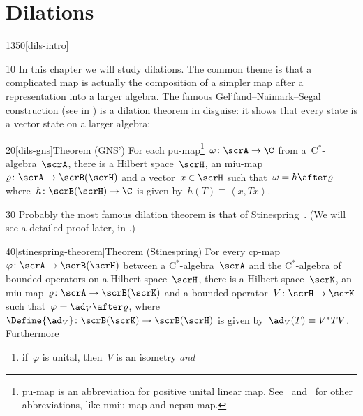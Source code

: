 
\chapter{Dilations}\label{chapter1}

\begin{parsec}{1350}[dils-intro]%
\begin{point}{10}%
In this chapter we will study dilations.
The common theme is that a complicated map
    is actually the composition of a simpler map
    after a representation into a larger algebra.
    The famous Gel'fand--Naimark--Segal construction (see 
        in \cite{bram})
    is a dilation theorem in disguise:
    it shows that every state is a vector state on a larger algebra:
\end{point}
\begin{point}{20}[dils-gns]{Theorem (GNS')}%
    For each pu-map\footnote{%
        pu-map is an abbreviation for positive unital linear map.
        See~ and~
            for other abbreviations, like nmiu-map
            and ncpsu-map.
        }~$\omega\colon \scrA \to \C$
        from a~C$^*$-algebra~$\scrA$,
    there is a Hilbert space~$\scrH$,
    an miu-map~$\varrho\colon \scrA \to \scrB(\scrH)$
    and a vector~$x \in \scrH$
    such that~$\omega = h \after \varrho$
    where~$h \colon \scrB(\scrH) \to \C$
    is given by~$h(T) \equiv \left<x,Tx\right>$.
\end{point}
\begin{point}{30}%
Probably the most famous dilation theorem is that
of Stinespring~\cite[thm.~1]{stinespring}.
(We will see a detailed proof later, in .)
\end{point}
\begin{point}{40}[stinespring-theorem]{Theorem (Stinespring)}
    For every cp-map~$\varphi\colon \scrA \to \scrB (\scrH)$
        between a C$^*$-algebra~$\scrA$
            and the C$^*$-algebra of
            bounded operators on a Hilbert space~$\scrH$,
    there is a Hilbert space~$\scrK$,
        an miu-map~$\varrho\colon \scrA \to \scrB(\scrK)$
        and a bounded operator~$V\colon \scrH \to \scrK$
        such that~$\varphi = \ad_V \after \varrho$,
        where~$\Define{\ad_V}\index{ad@$\ad_V$!Hilbert spaces} \colon \scrB(\scrK) \to \scrB(\scrH)$
        is given by~$\ad_V(T)\equiv V^*TV$.
Furthermore
\begin{enumerate}
\item
    if~$\varphi$ is unital, then~$V$ is an isometry \emph{and}

\end{enumerate}
\end{point}
\end{parsec}
